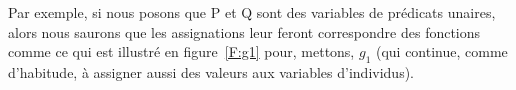 Par exemple, si nous posons que \vrb P et \vrb Q sont des variables de prédicats unaires, alors nous saurons que les assignations leur feront correspondre des fonctions comme ce qui est illustré en figure~\ref{F:g1} pour, mettons, $g_1$ (qui continue, comme d'habitude, à assigner aussi des valeurs aux variables d'individus).


\newcommand{\fxFP}%
{\left[
\begin{array}{l}
\begin{array}{@{}l}
\Obj{Alice}\rnode{a}{\stx}\\
\Obj{Bruno}\rnode{b}{\stx}\\
\Obj{Charles}\rnode{c}{\stx}\\
\Obj{Dina}\rnode{d}{\stx}\\
\end{array}%
\rule{2.5cm}{0pt}
\begin{array}{l@{}}
\rnode{1}{1}\\[2ex]\rnode{0}{0}
\end{array}
\end{array}\right]
\ncline[nodesep=3pt]{->}{a}{1}
\ncline[nodesep=3pt,offsetB=2pt]{->}{b}{0}
\ncline[nodesep=3pt]{->}{c}{0}
\ncline[nodesep=3pt,offsetB=-1pt]{->}{d}{1}%
}

\newcommand{\fxFQ}
{\left[
\begin{array}{l}
\begin{array}{@{}l}
\Obj{Alice}\rnode{a}{\stx}\\
\Obj{Bruno}\rnode{b}{\stx}\\
\Obj{Charles}\rnode{c}{\stx}\\
\Obj{Dina}\rnode{d}{\stx}\\
\end{array}\rule{2.5cm}{0pt}
\begin{array}{l@{}}
\rnode{1}{1}\\[2ex]\rnode{0}{0}
\end{array}
\end{array}\right]
\ncline[nodesep=3pt,offsetB=2pt]{->}{a}{0}
\ncline[nodesep=3pt]{->}{b}{0}
\ncline[nodesep=3pt]{->}{c}{1}
\ncline[nodesep=3pt,offsetB=-2pt]{->}{d}{0}%
}



